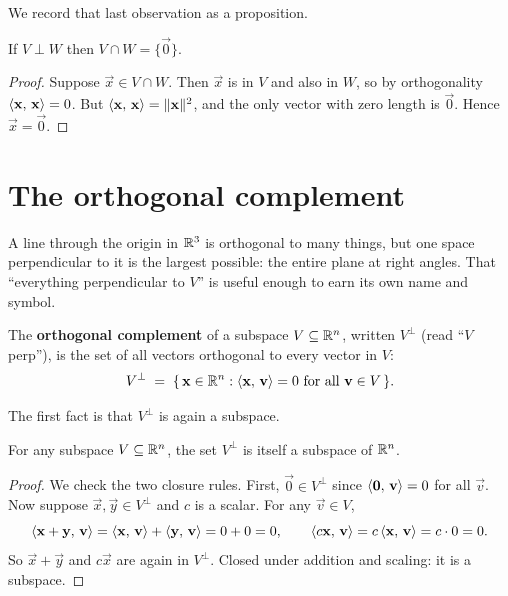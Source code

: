 We record that last observation as a proposition.

\begin{proposition}\label{ch17:trivial-intersection}
If $V\perp W$ then $V\cap W = \{\vec{0}\}$.
\end{proposition}

\begin{proof}
Suppose $\vec{x}\in V\cap W$. Then $\vec{x}$ is in $V$ and also in $W$, so by orthogonality
$\langle \mathbf{x},\, \mathbf{x} \rangle=0$. But $\langle \mathbf{x},\, \mathbf{x} \rangle=\lVert\mathbf{x}\rVert^2$, and the only vector
with zero length is $\vec{0}$. Hence $\vec{x}=\vec{0}$.
\end{proof}

\section{The orthogonal complement}

A line through the origin in $\mathbb{R}^3$ is orthogonal to many things, but one space perpendicular to it
is the largest possible: the entire plane at right angles. That ``everything perpendicular to $V$''
is useful enough to earn its own name and symbol.

\begin{definition}\label{ch17:def-complement}
The \textbf{orthogonal complement} of a subspace $V\subseteq\mathbb{R}^n$, written $V^{\perp}$ (read
``$V$ perp''), is the set of all vectors orthogonal to every vector in $V$:
\[
  V^{\perp} \;=\; \{\,\mathbf{x}\in\mathbb{R}^n : \langle \mathbf{x},\, \mathbf{v} \rangle=0 \text{ for all }\mathbf{v}\in V\,\}.
\]
\end{definition}

The first fact is that $V^\perp$ is again a subspace.

\begin{proposition}\label{ch17:perp-is-subspace}
For any subspace $V\subseteq\mathbb{R}^n$, the set $V^{\perp}$ is itself a subspace of $\mathbb{R}^n$.
\end{proposition}

\begin{proof}
We check the two closure rules. First, $\vec{0}\in V^\perp$ since $\langle \mathbf{0},\, \mathbf{v} \rangle=0$ for
all $\vec{v}$. Now suppose $\vec{x},\vec{y}\in V^\perp$ and $c$ is a scalar. For any $\vec{v}\in V$,
\[
  \langle \mathbf{x}+\mathbf{y},\, \mathbf{v} \rangle = \langle \mathbf{x},\, \mathbf{v} \rangle + \langle \mathbf{y},\, \mathbf{v} \rangle = 0+0 = 0,
  \qquad
  \langle c\mathbf{x},\, \mathbf{v} \rangle = c\,\langle \mathbf{x},\, \mathbf{v} \rangle = c\cdot 0 = 0.
\]
So $\vec{x}+\vec{y}$ and $c\vec{x}$ are again in $V^\perp$. Closed under addition and scaling: it
is a subspace.
\end{proof}


